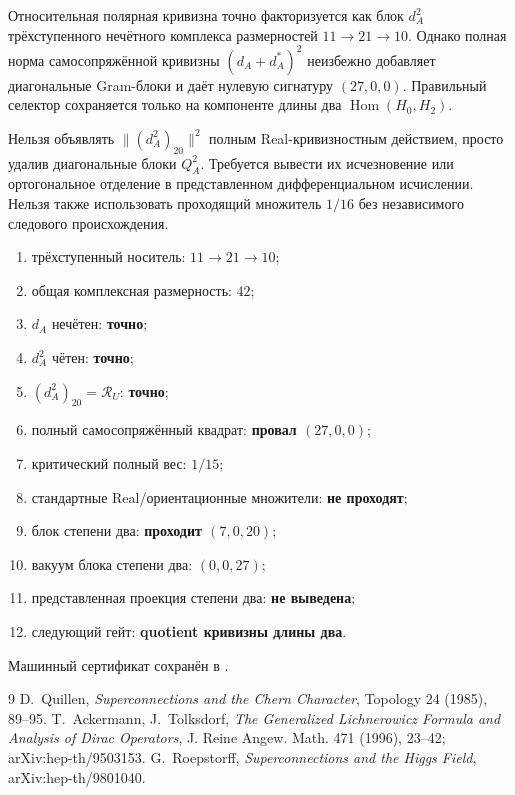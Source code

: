 \begin{theorem}
Относительная полярная кривизна точно факторизуется как блок $d_A^2$
трёхступенного нечётного комплекса размерностей $11\to21\to10$. Однако
полная норма самосопряжённой кривизны $(d_A+d_A^*)^2$ неизбежно добавляет
диагональные Gram-блоки и даёт нулевую сигнатуру $(27,0,0)$. Правильный
селектор сохраняется только на компоненте длины два
$\operatorname{Hom}(H_0,H_2)$.
\end{theorem}

\begin{nogocriterion}
Нельзя объявлять $\|(d_A^2)_{20}\|^2$ полным Real-кривизностным действием,
просто удалив диагональные блоки $Q_A^2$. Требуется вывести их исчезновение
или ортогональное отделение в представленном дифференциальном исчислении.
Нельзя также использовать проходящий множитель $1/16$ без независимого
следового происхождения.
\end{nogocriterion}

\begin{protocol}
\begin{enumerate}
 \item трёхступенный носитель: \textbf{$11\to21\to10$};
 \item общая комплексная размерность: \textbf{$42$};
 \item $d_A$ нечётен: \textbf{точно};
 \item $d_A^2$ чётен: \textbf{точно};
 \item $(d_A^2)_{20}=\mathcal R_U$: \textbf{точно};
 \item полный самосопряжённый квадрат: \textbf{провал $(27,0,0)$};
 \item критический полный вес: \textbf{$1/15$};
 \item стандартные Real/ориентационные множители: \textbf{не проходят};
 \item блок степени два: \textbf{проходит $(7,0,20)$};
 \item вакуум блока степени два: \textbf{$(0,0,27)$};
 \item представленная проекция степени два: \textbf{не выведена};
 \item следующий гейт: \textbf{quotient кривизны длины два}.
\end{enumerate}
\end{protocol}

Машинный сертификат сохранён в
.

\begin{thebibliography}{9}
D.~Quillen,
\emph{Superconnections and the Chern Character},
Topology 24 (1985), 89--95.
T.~Ackermann, J.~Tolksdorf,
\emph{The Generalized Lichnerowicz Formula and Analysis of Dirac Operators},
J. Reine Angew. Math. 471 (1996), 23--42; arXiv:hep-th/9503153.
G.~Roepstorff,
\emph{Superconnections and the Higgs Field},
arXiv:hep-th/9801040.
\end{thebibliography}